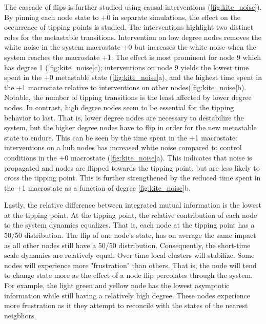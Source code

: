 \documentclass[a4paper, 11pt, twocolumn]{article}
\begin{document}
The cascade of flips is further studied using causal interventions (\cref{fig:kite_noise}). By pinning each node state to +0 in separate simulations, the effect on the occurrence of tipping points is studied. The interventions highlight two distinct roles for the metastable transitions. Intervention on low degree nodes removes the white noise in the system macrostate +0 but increases the white noise when the system reaches the macrostate +1. The effect is most prominent for node 9 which has degree 1 (\cref{fig:kite_noise}{c}); interventions on node 9 yields the lowest time spent in the +0 metastable state (\cref{fig:kite_noise}{a}), and the highest time spent in the +1 macrostate relative to interventions on other nodes(\cref{fig:kite_noise}{b}). Notable, the number of tipping transitions is the least affected by lower degree nodes. In contrast, high degree nodes seem to be essential for the tipping behavior to last. That is, lower degree nodes are necessary to destabilize the system, but the higher degree nodes have to flip in order for the new metastable state to endure. This can be seen by the time spent in the +1 macrostate: interventions on a hub nodes has increased white noise compared to control conditions in the +0 macrostate (\cref{fig:kite_noise}{a}). This indicates that noise is propagated and nodes are flipped towards the tipping point, but are less likely  to cross the tipping point. This is further strengthened by the reduced time spent in the +1 macrostate as a function of degree \cref{fig:kite_noise}{b}.

Lastly, the relative difference between integrated mutual information is the lowest at the tipping point. At the tipping point, the relative contribution of each node to the system dynamics equalizes. That is, each node at the tipping point has a 50/50 distribution. The flip of one node's state, has on average the same impact as all other nodes still have a 50/50 distribution. Consequently, the short-time scale dynamics are relatively equal. Over time local clusters will stabilize. Some nodes will experience more "frustration" than others. That is, the node will tend to change state more as the effect of a node flip percolates through the system. For example, the light green and yellow node has the lowest asymptotic information while still having a relatively high degree. These nodes experience more frustration as it they attempt to reconcile with the states of the nearest neigbhors.
\end{document}
